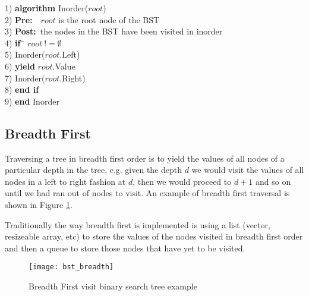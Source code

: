 \begin{tabbing}
1)  \textbf{alg}\= \textbf{orithm} Inorder($root$) \\
2)  \> \textbf{Pre:}~~$root$ is the root node of the BST \\
3)  \> \textbf{Post:}~the nodes in the BST have been visited in inorder \\
4)  \> \textbf{if}~\= $root~!= \emptyset$ \\
5)  \> \> Inorder($root$.Left) \\
6)  \> \> \textbf{yield} $root$.Value \\
7)  \> \> Inorder($root$.Right) \\
8)  \> \textbf{end if} \\
9)  \textbf{end} Inorder \\
\end{tabbing}

\subsection{Breadth First} \label{breadth_first}
Traversing a tree in breadth first order is to yield the values of all nodes of a particular depth in the tree, e.g. given the depth $d$ we would visit the values of all nodes in a left to right fashion at $d$, then we would proceed to $d+1$ and so on until we had ran out of nodes to visit. An example of breadth first traversal is shown in Figure \ref{fig:bst_breadth}.

Traditionally the way breadth first is implemented is using a list (vector, resizeable array, etc) to store the values of the nodes visited in breadth first order and then a queue to store those nodes that have yet to be visited.

\begin{figure}[htp]
\begin{center}
\texttt{[image: bst\_breadth]}
\end{center}
\caption{Breadth First visit binary search tree example} \label{fig:bst_breadth}
\end{figure}

